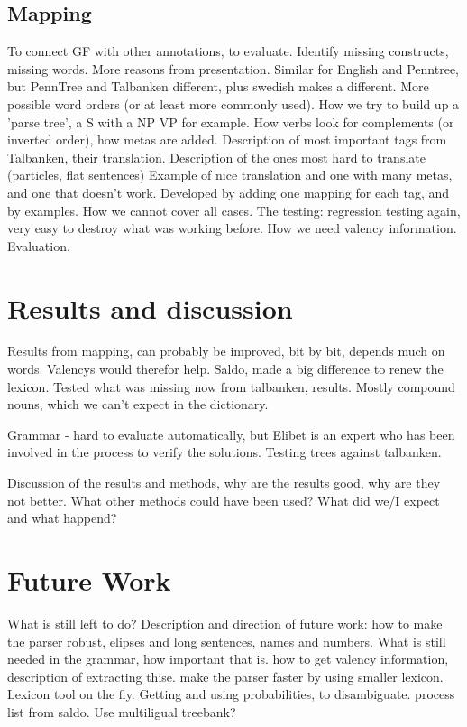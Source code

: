 \documentclass{article}
\begin{document}
\subsection{Mapping}
To connect GF with other annotations, to evaluate. Identify missing constructs,
missing words. More reasons from presentation.
Similar for English and Penntree, but PennTree and Talbanken different, plus swedish
makes a different. More possible word orders (or at least more commonly used).
How we try to build up a 'parse tree', a S with a NP VP for example. 
How verbs look for complements (or inverted order), how metas are added.
Description of most important tags from Talbanken, their translation.
Description of the ones most hard to translate (particles, flat sentences)
Example of nice translation and one with many metas, and one that doesn't work.
Developed by adding one mapping for each tag, and by examples.
How we cannot cover all cases. The testing: regression testing again,
very easy to destroy what was working before. 
How we need valency information.
Evaluation. 



\section{Results and discussion}
Results from mapping, can probably be improved, bit by bit, depends much on words.
Valencys would therefor help.  
Saldo, made a big difference to renew the lexicon. Tested what was missing now from talbanken,
results. Mostly compound nouns, which we can't expect in the dictionary.

Grammar - hard to evaluate automatically, but Elibet is an expert who has been involved
in the process to verify the solutions. Testing trees against talbanken.

Discussion of the results and methods, why are the results good, why are they not better.
What other methods could have been used? What did we/I expect and what happend?


\section{Future Work}
What is still left to do? Description and direction of future work:
how to make the parser robust, elipses and long sentences, names and numbers.
What is still needed in the grammar, how important that is. 
how to get valency information, description of extracting thise.
make the parser faster by using smaller lexicon.
Lexicon tool on the fly.
Getting and using probabilities, to disambiguate.
process list from saldo.
Use multiligual treebank?
\end{document}
